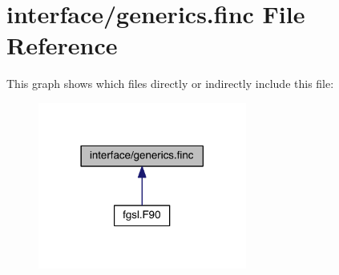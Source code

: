 \hypertarget{generics_8finc}{\section{interface/generics.finc File Reference}
\label{generics_8finc}
}
This graph shows which files directly or indirectly include this file\-:\nopagebreak
\begin{figure}[H]
\begin{center}
\leavevmode
\includegraphics[width=194pt]{generics_8finc__dep__incl}
\end{center}
\end{figure}
